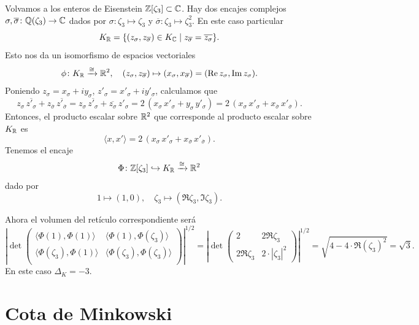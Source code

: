 \begin{ejemplo}
  \label{ejemplo:encaje-de-enteros-de-Eisenstein}
  Volvamos a los enteros de Eisenstein $\mathbb{Z} [\zeta_3] \subset \mathbb{C}$.
  Hay dos encajes complejos
  $\sigma, \overline{\sigma}\colon \mathbb{Q} (\zeta_3) \to \mathbb{C}$ dados por
  $\sigma\colon \zeta_3 \mapsto \zeta_3$ y
  $\overline{\sigma}\colon \zeta_3 \mapsto \zeta_3^2$. En este caso particular
  $$K_{\mathbb{R}} = \{ (z_\sigma, z_{\overline{\sigma}}) \in K_{\mathbb{C}} \mid z_{\overline{\sigma}} = \overline{z_\sigma} \}.$$
  Esto nos da un isomorfismo de espacios vectoriales
  \[ \phi\colon K_{\mathbb{R}} \xrightarrow{\cong} \mathbb{R}^2, \quad
     (z_\sigma, z_{\overline{\sigma}}) \mapsto (x_\sigma, x_{\overline{\sigma}}) = (\operatorname{Re} z_\sigma, \operatorname{Im} z_\sigma). \]
  Poniendo
  $z_\sigma = x_\sigma + i y_\sigma$, $z'_\sigma = x'_\sigma + i y'_\sigma$,
  calculamos que
  \[ z_\sigma \, \overline{z'_\sigma} + z_{\overline{\sigma}} \, \overline{z'_{\overline{\sigma}}} =
     z_\sigma \, \overline{z'_\sigma} + \overline{z_\sigma} \, z'_\sigma =
     2\,(x_\sigma\,x'_\sigma + y_\sigma\,y'_\sigma) =
     2\,(x_\sigma\,x'_\sigma + x_{\overline{\sigma}}\,x'_{\overline{\sigma}}). \]
  Entonces, el producto escalar sobre $\mathbb{R}^2$ que corresponde al producto escalar
  sobre $K_{\mathbb{R}}$ es
  $$\langle x, x'\rangle = 2\,(x_\sigma\,x'_\sigma + x_{\overline{\sigma}}\,x'_{\overline{\sigma}}).$$
  Tenemos el encaje
  $$\Phi\colon \mathbb{Z} [\zeta_3] \hookrightarrow K_{\mathbb{R}} \xrightarrow{\cong} \mathbb{R}^2$$
  dado por
  \[ 1 \mapsto (1, 0), \quad
     \zeta_3 \mapsto (\Re \zeta_3, \Im \zeta_3). \]

  Ahora el volumen del retículo correspondiente será
  \[ \left|\det \begin{pmatrix}
    \langle \Phi (1), \Phi (1) \rangle & \langle \Phi (1), \Phi (\zeta_3) \rangle \\
    \langle \Phi (\zeta_3), \Phi (1) \rangle & \langle \Phi (\zeta_3), \Phi (\zeta_3) \rangle \\
  \end{pmatrix}\right|^{1/2} =
  \left|\det \begin{pmatrix}
    2 & 2 \Re \zeta_3 \\
    2 \Re \zeta_3 & 2\cdot |\zeta_3|^2
  \end{pmatrix}\right|^{1/2} = \sqrt{4 - 4\cdot \Re (\zeta_3)^2} = \sqrt{3}. \]
  En este caso $\Delta_K = -3$.
\end{ejemplo}


\section{Cota de Minkowski}

